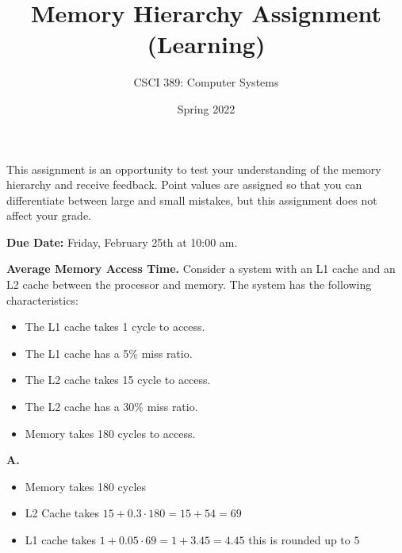 \documentclass{exam}
\begin{document}
\title{Memory Hierarchy Assignment (Learning)}
\author{CSCI 389: Computer Systems}
\date{Spring 2022}
\maketitle


This assignment is an opportunity to test your understanding of the memory hierarchy and receive feedback. 
Point values are assigned so that you can differentiate between large and small mistakes, but this assignment does not affect your grade. 

\textbf{Due Date:}
Friday, February 25th at 10:00 am. 

\begin{questions}

\question[10]
\textbf{Average Memory Access Time.}
Consider a system with an L1 cache and an L2 cache between the processor and memory. 
The system has the following characteristics:
\begin{itemize}
\item The L1 cache takes 1 cycle to access.
\item The L1 cache has a 5\% miss ratio. 
\item The L2 cache takes 15 cycle to access.
\item The L2 cache has a 30\% miss ratio. 
\item Memory takes 180 cycles to access. 
\end{itemize}



\textbf{A.}

\begin{itemize}
\item Memory takes 180 cycles
\item L2 Cache takes $15+0.3 \cdot 180=15+54=69$
\item L1 cache takes $1+0.05 \cdot 69 = 1+3.45=4.45$ this is rounded up to $5$
\end{itemize}



\end{questions}
\end{document}
